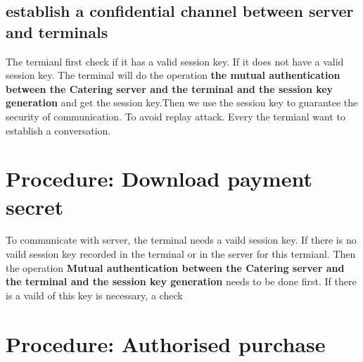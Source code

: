 \documentclass{article}
\begin{document}
        \subsection*{establish a confidential channel between server and terminals}
The termianl first check if it has a valid session key. If it does not have a valid session key. The terminal will do the operation \textbf{the mutual authentication between the Catering server and the terminal and the session key generation} and get the session key.Then we use the session key to guarantee the security of communication.
        \newline
To avoid replay attack. Every the termianl want to establish a conversation.  

    \section{Procedure: Download payment secret}
To communicate with server, the terminal needs a vaild session key. If there is no vaild session key recorded in the terminal or in the server for this termianl. Then the operation \textbf{Mutual authentication between the Catering server and the terminal and the session key generation} needs to be done first. If there is a vaild of this key is necessary, a check  
    \section{Procedure: Authorised purchase}
\end{document}
